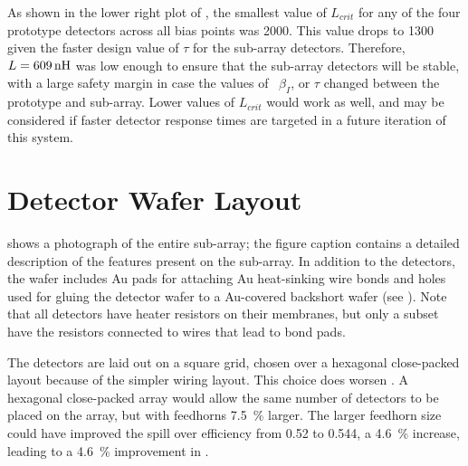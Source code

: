 As shown in the lower right plot of , the smallest value of $L_{crit}$ for any of the four prototype detectors across all bias points was \SI{2000}{\nH}.
This value drops to \SI{1300}{\nH} given the faster design value of $\tau$ for the sub-array detectors.
Therefore, $L = \SI{609}{\nH}$ was low enough to ensure that the sub-array detectors will be stable, with a large safety margin in case the values of \Loop\, $\beta_I$, or $\tau$ changed between the prototype and sub-array.
Lower values of $L_{crit}$ would work as well, and may be considered if faster detector response times are targeted in a future iteration of this system.

\section{Detector Wafer Layout} \label{sec:ch5-layout}

 shows a photograph of the entire sub-array; the figure caption contains a detailed description of the features present on the sub-array.
In addition to the detectors, the wafer includes Au pads for attaching Au heat-sinking wire bonds and holes used for gluing the detector wafer to a Au-covered backshort wafer (see ).
Note that all detectors have heater resistors on their membranes, but only a subset have the resistors connected to wires that lead to bond pads.

The detectors are laid out on a square grid, chosen over a hexagonal close-packed layout because of the simpler wiring layout.
This choice does worsen \NETD.
A hexagonal close-packed array would allow the same number of detectors to be placed on the array, but with feedhorns \SI{7.5}{\percent} larger.
The larger feedhorn size could have improved the spill over efficiency from \num{0.52} to \num{0.544}, a \SI{4.6}{\percent} increase, leading to a \SI{4.6}{\percent} improvement in \NETD.

